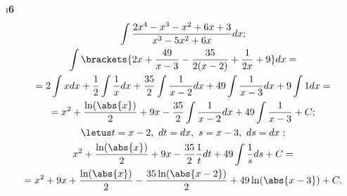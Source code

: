 \i \textbf{6}
\begin{gather*}
    \int \frac{2x^4-x^3-x^2+6x+3}{x^3-5x^2+6x}dx;\\
    \int\brackets{2x + \frac{49}{x-3} - \frac{35}{2(x-2)} + \frac{1}{2x} + 9}dx = \\
    = 2\int xdx + \frac{1}{2}\int \frac{1}{x}dx + \frac{35}{2}\int \frac{1}{x-2}dx + 49\int \frac{1}{x-3}dx + 9\int 1dx = \\
    = x^2 + \frac{\ln(\abs{x})}{2} + 9x - \frac{35}{2}\int \frac{1}{x-2}dx + 49\int \frac{1}{x-3} + C;\\
    \letus t = x-2,\ dt = dx,\ s = x-3,\ ds = dx:\\
    x^2 + \frac{\ln(\abs{x})}{2} + 9x - \frac{35}{2}\frac{1}{t}dt + 49\int \frac{1}{s}ds + C = \\
    = x^2 + 9x + \frac{\ln(\abs{x})}{2} - \frac{35\ln(\abs{x-2})}{2} + 49\ln(\abs{x-3}) + C.
\end{gather*}